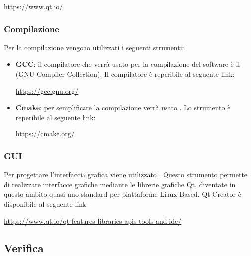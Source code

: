 \documentclass[../NormediProgetto.tex]{subfiles}
\begin{document}
	\begin{center}
		\centerline{\url{https://www.qt.io/}}
	\end{center}

	\subsubsection{Compilazione}

	Per la compilazione vengono utilizzati i seguenti strumenti:

	\begin{itemize}
		\item \textbf{GCC}: il compilatore che verrà usato per la compilazione del software è il  (GNU Compiler Collection). Il compilatore è reperibile al seguente link:
		
		\begin{center}
			\centerline{\url{https://gcc.gnu.org/}}
		\end{center}
	
		\item \textbf{Cmake}: per semplificare la compilazione verrà usato . Lo strumento è reperibile al seguente link:
		
		\begin{center}
			\centerline{\url{https://cmake.org/}}
		\end{center}
	
	\end{itemize}

	\subsubsection{GUI}

	Per progettare l'interfaccia grafica viene utilizzato . Questo strumento permette di realizzare interfacce grafiche mediante le librerie grafiche Qt, diventate in questo ambito quasi uno standard per piattaforme Linux Based. Qt Creator è disponibile al seguente link: 
	
	\begin{center}
		\centerline{\url{https://www.qt.io/qt-features-libraries-apis-tools-and-ide/}}
	\end{center}
	
	
	\subsection{Verifica}
	
\end{document}
